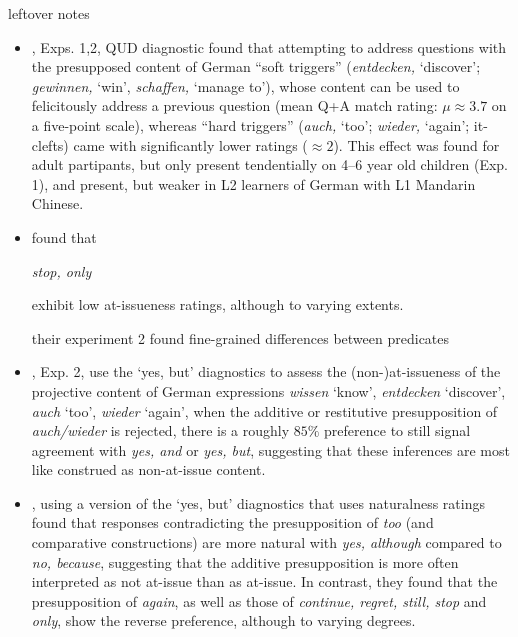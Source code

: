 leftover notes






    \begin{itemize}
      \item \citealt{chen_presuppositions_2024}, Exps. 1,2, QUD diagnostic found that attempting to address questions with the presupposed content of German \enquote{soft triggers} (\emph{entdecken,} ‘discover’; \emph{gewinnen,} ‘win’, \emph{schaffen,} ‘manage to’), whose content can be used to felicitously address a previous question (mean Q+A match rating: $\mu \approx 3.7$ on a five-point scale), whereas \enquote{hard triggers} (\emph{auch,} ‘too’; \emph{wieder,} ‘again’; it-clefts) came with significantly lower ratings ($\approx 2$). This effect was found for adult partipants, but only present tendentially on 4--6 year old children (Exp. 1), and present, but weaker in L2 learners of German with L1 Mandarin Chinese.

      
      \item \citealt{tonhauser_how_2018} found that 

      \emph{stop, only }

      exhibit low at-issueness ratings, although to varying extents.

      their experiment 2 found fine-grained differences between predicates
      

      \item \citealt{xue_correlation_2011}, Exp. 2, use the `yes, but' diagnostics to assess the (non-)at-issueness of the projective content of German expressions \emph{wissen} `know',  \emph{entdecken} `discover',  \emph{auch} `too',  \emph{wieder} `again', when the additive or restitutive presupposition of \emph{auch/wieder} is rejected, there is a roughly $85\%$ preference to still signal agreement with \emph{yes, and} or \emph{yes, but}, suggesting that these inferences are most like construed as non-at-issue content.

      \item \citealt{cummins_backgrounding_2013}, using a version of the `yes, but' diagnostics that uses naturalness ratings found that responses contradicting the presupposition of \emph{too} (and comparative constructions) are more natural with \emph{yes, although} compared to \emph{no, because}, suggesting that the additive presupposition is more often interpreted as not at-issue than as at-issue. In contrast, they found that the presupposition of \emph{again}, as well as those of \emph{continue, regret, still, stop} and \emph{only}, show the reverse preference, although to varying degrees.


    \end{itemize}

